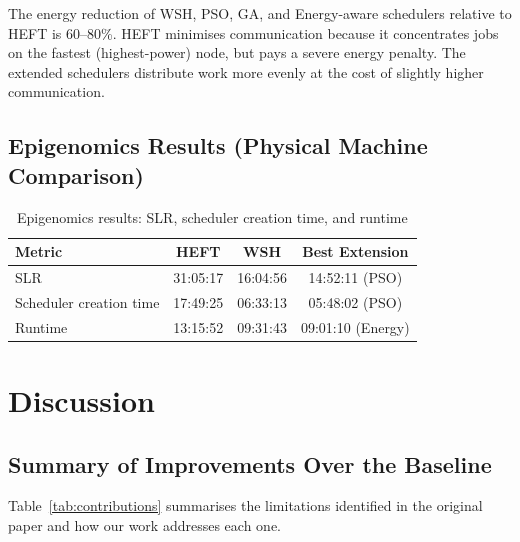 \documentclass[12pt,a4paper]{article}
\begin{document}
The energy reduction of WSH, PSO, GA, and Energy-aware schedulers relative to HEFT is 60--80\%. HEFT minimises communication because it concentrates jobs on the fastest (highest-power) node, but pays a severe energy penalty. The extended schedulers distribute work more evenly at the cost of slightly higher communication.

\subsection{Epigenomics Results (Physical Machine Comparison)}

\begin{table}[H]
\centering
\caption{Epigenomics results: SLR, scheduler creation time, and runtime}
\label{tab:epigenomics}
\begin{tabular}{@{}lccc@{}}
\toprule
\textbf{Metric} & \textbf{HEFT} & \textbf{WSH} & \textbf{Best Extension} \\
\midrule
SLR & 31:05:17 & 16:04:56 & 14:52:11 (PSO) \\
Scheduler creation time & 17:49:25 & 06:33:13 & 05:48:02 (PSO) \\
Runtime & 13:15:52 & 09:31:43 & 09:01:10 (Energy) \\
\bottomrule
\end{tabular}
\end{table}

\section{Discussion}
\label{sec:discussion}

\subsection{Summary of Improvements Over the Baseline}

Table~\ref{tab:contributions} summarises the limitations identified in the original paper and how our work addresses each one.
\end{document}
